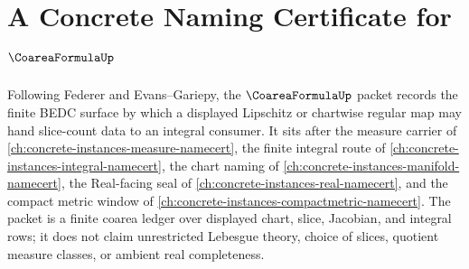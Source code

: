 \chapter{A Concrete Naming Certificate for $\CoareaFormulaUp$}
\label{ch:concrete-instances-coarea-formula-namecert}

Following Federer and Evans--Gariepy, the $\CoareaFormulaUp$ packet records the finite BEDC surface by which a displayed Lipschitz or chartwise regular map may hand slice-count data to an integral consumer. It sits after the measure carrier of \autoref{ch:concrete-instances-measure-namecert}, the finite integral route of \autoref{ch:concrete-instances-integral-namecert}, the chart naming of \autoref{ch:concrete-instances-manifold-namecert}, the Real-facing seal of \autoref{ch:concrete-instances-real-namecert}, and the compact metric window of \autoref{ch:concrete-instances-compactmetric-namecert}. The packet is a finite coarea ledger over displayed chart, slice, Jacobian, and integral rows; it does not claim unrestricted Lebesgue theory, choice of slices, quotient measure classes, or ambient real completeness.

